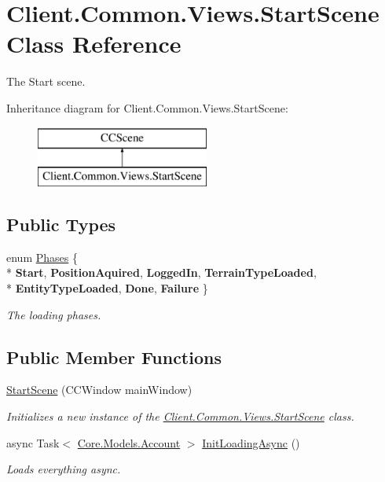 \hypertarget{classClient_1_1Common_1_1Views_1_1StartScene}{}\section{Client.\+Common.\+Views.\+Start\+Scene Class Reference}
\label{classClient_1_1Common_1_1Views_1_1StartScene}


The Start scene.  


Inheritance diagram for Client.\+Common.\+Views.\+Start\+Scene\+:\begin{figure}[H]
\begin{center}
\leavevmode
\includegraphics[height=2.000000cm]{classClient_1_1Common_1_1Views_1_1StartScene}
\end{center}
\end{figure}
\subsection*{Public Types}
\begin{DoxyCompactItemize}
\item 
enum \hyperlink{classClient_1_1Common_1_1Views_1_1StartScene_a5ac44ab2a6140aa7283255095f8503f2}{Phases} \{ \\*
{\bfseries Start}, 
{\bfseries Position\+Aquired}, 
{\bfseries Logged\+In}, 
{\bfseries Terrain\+Type\+Loaded}, 
\\*
{\bfseries Entity\+Type\+Loaded}, 
{\bfseries Done}, 
{\bfseries Failure}
 \}\begin{DoxyCompactList}\small\item\em The loading phases. \end{DoxyCompactList}
\end{DoxyCompactItemize}
\subsection*{Public Member Functions}
\begin{DoxyCompactItemize}
\item 
\hyperlink{classClient_1_1Common_1_1Views_1_1StartScene_a9bb2c1aec787e16d9d2b4f6de0cc15fc}{Start\+Scene} (C\+C\+Window main\+Window)
\begin{DoxyCompactList}\small\item\em Initializes a new instance of the \hyperlink{classClient_1_1Common_1_1Views_1_1StartScene}{Client.\+Common.\+Views.\+Start\+Scene} class. \end{DoxyCompactList}\item 
async Task$<$ \hyperlink{classCore_1_1Models_1_1Account}{Core.\+Models.\+Account} $>$ \hyperlink{classClient_1_1Common_1_1Views_1_1StartScene_a7ddd4830c8ecf66c6f03b6e0b046dcee}{Init\+Loading\+Async} ()
\begin{DoxyCompactList}\small\item\em Loads everything async. \end{DoxyCompactList}\end{DoxyCompactItemize}
